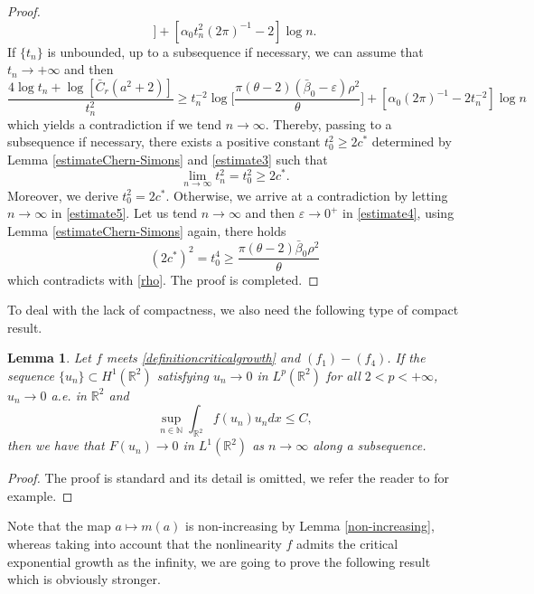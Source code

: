 \documentclass[11pt]{amsart}
\numberwithin{equation}{section}
\newtheorem{lemma}[theorem]{Lemma}
\theoremstyle{definition}
\newcommand{\R}{\mathbb{R}}
\begin{document}
\begin{proof}
\begin{equation}
\bigg]
+[\alpha_0t_n^2(2\pi) ^{-1}  -2]\log n.
\end{equation}
If $\{t_n\}$ is unbounded, up to a subsequence if necessary, we can assume that
$t_n\to+\infty$ and then
\[
\frac{4\log t_n+ \log[\bar{C}_r(a^2+2)]}{t_n^2}  \geq t_n^{-2}\log\bigg[\frac{\pi(\theta-2)\left(\bar{\beta}_{0}-\varepsilon\right)\rho^2}{\theta}
\bigg]
+[\alpha_0  (2\pi) ^{-1} -2t_n^{-2} ]\log n
\]
which yields a contradiction
if we tend $n\to\infty$. Thereby, passing to a subsequence if necessary, there exists a
positive constant $t_0^{2}\geq 2c^*$ determined by Lemma \ref{estimateChern-Simons} and \eqref{estimate3} such that
\[
\lim_{n\to\infty} t_n^{2}=t_0^{2}\geq 2c^*.
\]
 Moreover, we derive
$t_0^{2}= 2c^*$. Otherwise, we arrive at a contradiction by letting
$n\to\infty$ in \eqref{estimate5}. Let us tend $n\to\infty$ and then $\varepsilon\to0^+$ in \eqref{estimate4},
using Lemma \ref{estimateChern-Simons} again, there holds
\[
(2c^*)^2=t_0^{4}\geq  \frac{\pi(\theta-2)\bar{\beta}_{0}\rho^2}{\theta}
\]
which contradicts with \eqref{rho}.
The proof is completed.
\end{proof}

To deal with the lack of compactness, we also need the following type of compact result.

 \begin{lemma}\label{2compact}
Let $f$ meets
\eqref{definitioncriticalgrowth} and $(f_1)-(f_4)$. If the sequence $\{u_n\}\subset H^1(\R^2)$ satisfying
$u_n\to 0$ in $L^p(\R^2)$ for all $2<p<+\infty$, $u_n\to 0$ a.e. in $\R^2$
and
\begin{equation}\label{2compact1}
\sup_{n\in \mathbb{N}}\int_{\R^2} f(u_n)u_ndx\leq C,
\end{equation}
then we have that $F(u_n)\to 0$ in $L^1(\R^2)$ as $n\to\infty$ along a subsequence.
\end{lemma}
\begin{proof}
The proof is standard and its detail is omitted, we refer the reader to \cite{Figueiredo} for example.
\end{proof}

Note that the map $a\mapsto m(a)$ is non-increasing by Lemma \ref{non-increasing}, whereas
taking into account that the nonlinearity $f$ admits the critical exponential growth as the infinity,
we are going to prove the following result which is obviously stronger.
\end{document}
